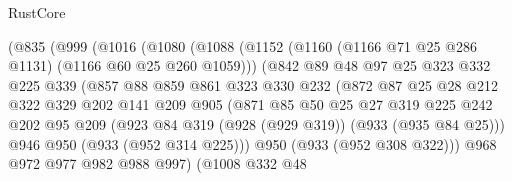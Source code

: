 \begin{lexlean}{RustCore}
\begin{coremodule}
                      (@835
                        (@999
                          (@1016
                            (@1080
                              (@1088
                                (@1152
                                  (@1160 (@1166 @71 @25 @286 @1131) (@1166 @60 @25 @260 @1059)))
                                (@842
                                  @89
                                  @48
                                  @97
                                  @25
                                  @323
                                  @332
                                  @225
                                  @339
                                  (@857
                                    @88
                                    @859
                                    @861
                                    @323
                                    @330
                                    @232
                                    (@872
                                      @87
                                      @25
                                      @28
                                      @212
                                      @322
                                      @329
                                      @202
                                      @141
                                      @209
                                      @905
                                      (@871
                                        @85
                                        @50
                                        @25
                                        @27
                                        @319
                                        @225
                                        @242
                                        @202
                                        @95
                                        @209
                                        (@923 @84 @319 (@928 (@929 @319)) (@933 (@935 @84 @25)))
                                        @946
                                        @950
                                        (@933 (@952 @314 @225)))
                                      @950
                                      (@933 (@952 @308 @322)))
                                    @968
                                    @972
                                    @977
                                    @982
                                    @988
                                    @997)
                                  (@1008
                                    @332
                                    @48

\end{coremodule}
\end{lexlean}
